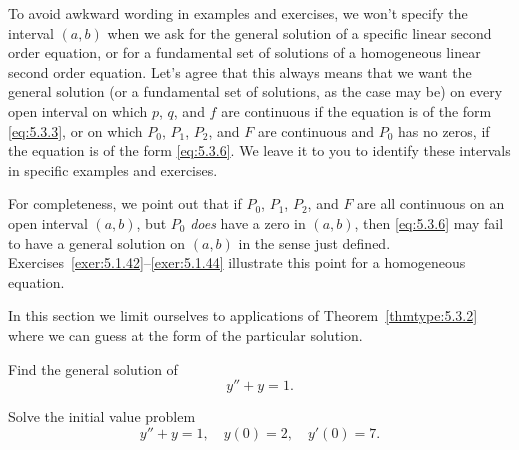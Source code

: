 To avoid awkward wording in examples and exercises, we won't specify the interval $(a,b)$ when we
ask for the general solution of a specific linear second order equation, or for a fundamental set of
solutions of a homogeneous linear second order equation. Let's agree that this always means that we
want the general solution (or a fundamental set of solutions, as the case may be) on every open
interval on which $p$, $q$, and $f$ are continuous if the equation is of the form \eqref{eq:5.3.3},
or on which $P_{0}$, $P_{1}$, $P_{2}$, and $F$ are continuous and $P_{0}$ has no zeros, if the
equation is of the form \eqref{eq:5.3.6}. We leave it to you to identify these intervals in specific
examples and exercises.

For completeness, we point out that if $P_{0}$, $P_{1}$, $P_{2}$, and $F$ are all continuous on an
open interval $(a,b)$, but $P_{0}$ {\color{blue}\it does\/} have a zero in $(a,b)$, then
\eqref{eq:5.3.6} may fail to have a general solution on $(a,b)$ in the sense just defined.
Exercises~\ref{exer:5.1.42}--\ref{exer:5.1.44} illustrate this point for a homogeneous equation.

In this section we limit ourselves to applications of Theorem~\ref{thmtype:5.3.2} where we can
guess at the form of the particular solution.

\begin{example}
  \label{example:5.3.1} \rm \mbox{}
  \newline
  \begin{alist}
    \item %
    Find the general solution of
    \begin{equation}
      \label{eq:5.3.7}y''+y=1.
    \end{equation}

    \item %
    Solve the initial value problem
    \begin{equation}
      \label{eq:5.3.8}y''+y=1,\quad y(0)=2,\quad y'(0)=7.
    \end{equation}
  \end{alist}
\end{example}

